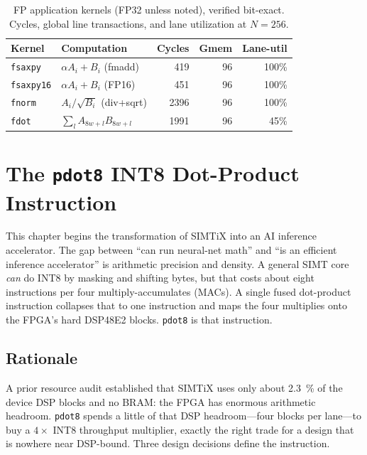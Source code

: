 \documentclass[12pt,a4paper,oneside]{report}
\newcommand{\code}[1]{\texttt{#1}}
\begin{document}
\begin{table}[t]
\caption{FP application kernels (FP32 unless noted), verified bit-exact. Cycles,
global line transactions, and lane utilization at $N{=}256$.}
\label{tab:fpkernels}
\centering
\small
\begin{tabular}{llrrr}
\toprule
Kernel & Computation & Cycles & Gmem & Lane-util\\
\midrule
\code{fsaxpy}   & $\alpha A_i + B_i$ (fmadd)  & 419      & 96 & 100\%\\
\code{fsaxpy16} & $\alpha A_i + B_i$ (FP16)   & 451      & 96 & 100\%\\
\code{fnorm}    & $A_i/\sqrt{B_i}$ (div+sqrt) & \num{2396} & 96 & 100\%\\
\code{fdot}     & $\sum_l A_{8w+l}B_{8w+l}$   & \num{1991} & 96 & 45\%\\
\bottomrule
\end{tabular}
\end{table}

\chapter{The \texttt{pdot8} INT8 Dot-Product Instruction}
\label{ch:pdot8}

This chapter begins the transformation of SIMTiX into an AI inference
accelerator. The gap between ``can run neural-net math'' and ``is an efficient
inference accelerator'' is arithmetic precision and density. A general SIMT core
\emph{can} do INT8 by masking and shifting bytes, but that costs about eight
instructions per four multiply-accumulates (MACs). A single fused dot-product
instruction collapses that to one instruction and maps the four multiplies onto
the FPGA's hard DSP48E2 blocks. \code{pdot8} is that instruction.

\section{Rationale}
A prior resource audit established that SIMTiX uses only about \SI{2.3}{\percent}
of the device DSP blocks and no BRAM: the FPGA has enormous arithmetic headroom.
\code{pdot8} spends a little of that DSP headroom---four blocks per lane---to buy a
$4\times$ INT8 throughput multiplier, exactly the right trade for a design that is
nowhere near DSP-bound. Three design decisions define the instruction.
\end{document}
